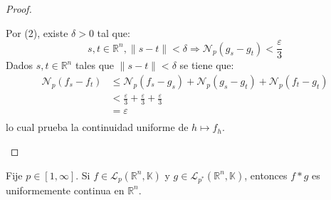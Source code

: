 \documentclass[12pt]{report}
\theoremstyle{largebreak}
\newcommand\norm[1]{\ensuremath{\|#1\|}}
\newcommand{\N}[2]{\ensuremath{\mathcal{N}_{#1}\left(#2\right)}}
\begin{document}
\begin{proof}
\begin{enumerate}
            Por (2), existe $\delta>0$ tal que:
            \begin{equation*}
                s,t\in\mathbb{R}^n,\norm{s-t}<\delta\Rightarrow\N{p}{g_s-g_t}<\frac{\varepsilon}{3}
            \end{equation*}
            Dados $s,t\in\mathbb{R}^n$ tales que $\norm{s-t}<\delta$ se tiene que:
            \begin{equation*}
                \begin{split}
                    \N{p}{f_s-f_t}&\leq\N{p}{f_s-g_s}+\N{p}{g_s-g_t}+\N{p}{f_t-g_t}\\
                    &<\frac{\varepsilon}{3}+\frac{\varepsilon}{3}+\frac{\varepsilon}{3}\\
                    &=\varepsilon\\
                \end{split}
            \end{equation*}
            lo cual prueba la continuidad uniforme de $h\mapsto f_h$.
        \end{enumerate}
    \end{proof}

    \begin{propo}
        Fije $p\in[1,\infty]$. Si $f\in\mathcal{L}_p(\mathbb{R}^n,\mathbb{K})$ y $g\in\mathcal{L}_{ p^*}(\mathbb{R}^n,\mathbb{K})$, entonces $f*g$ es uniformemente continua en $\mathbb{R}^n$.
    \end{propo}
\end{document}
